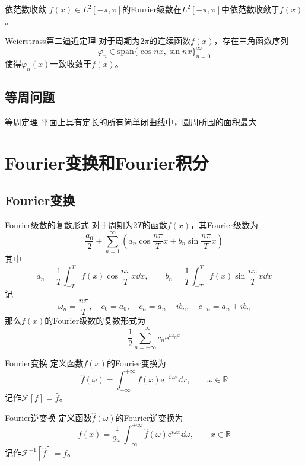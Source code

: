 \documentclass[lang = cn, scheme = chinese, thmcnt = section]{elegantbook}
\newcommand{\R}{\mathbb{R}}            %
\newcommand{\ee}[1]{\mathrm{e}^{#1}}
\begin{document}
\begin{theorem}{依范数收敛}
	$f(x)\in L^2[-\pi,\pi]$的Fourier级数在$L^2[-\pi,\pi]$中依范数收敛于$f(x)$。
\end{theorem}

\begin{theorem}{Weierstrass第二逼近定理}
	对于周期为$2\pi$的连续函数$f(x)$，存在三角函数序列
	$$
	\varphi_n\in 
	\text{span}\{ \cos nx,\sin nx \}_{n=0}^{\infty}
	$$
	使得$\varphi_n(x)$一致收敛于$f(x)$。
\end{theorem}

\subsection{等周问题}

\begin{theorem}{等周定理}
	平面上具有定长的所有简单闭曲线中，圆周所围的面积最大
\end{theorem}

\section{Fourier变换和Fourier积分}

\subsection{Fourier变换}

\begin{theorem}{Fourier级数的复数形式}
	对于周期为$2T$的函数$f(x)$，其Fourier级数为
	$$
	\frac{a_0}{2}+\sum_{n=1}^{\infty}\left(a_n\cos \frac{n\pi}{T}x+b_n\sin \frac{n\pi}{T}x\right)
	$$
	其中
	$$
	a_n=\frac{1}{T}\int_{-T}^{T}f(x)\cos \frac{n\pi}{T} x\dd x,\qquad 
	b_n=\frac{1}{T}\int_{-T}^{T}f(x)\sin \frac{n\pi}{T} x\dd x
	$$
	记
	$$
	\omega_n=\frac{n\pi}{T},\quad 
	c_0=a_0,\quad 
	c_n=a_n-ib_n,\quad 
	c_{-n}=a_n+ib_n
	$$
	那么$f(x)$的Fourier级数的复数形式为
	$$
	\frac{1}{2}\sum_{n=-\infty}^{+\infty}c_n\ee{i\omega_n x}
	$$
\end{theorem}

\begin{definition}{Fourier变换}
	定义函数$f(x)$的Fourier变换为
	$$
	\hat{f}(\omega)=\int_{-\infty}^{+\infty}f(x)\ee{-i\omega x}\dd x,\qquad \omega\in\R
	$$
	记作$\mathscr{F}[f]=\hat{f}$。
\end{definition}

\begin{definition}{Fourier逆变换}
	定义函数$\hat{f}(\omega)$的Fourier逆变换为
	$$
	f(x)=\frac{1}{2\pi}\int_{-\infty}^{+\infty}\hat{f}(\omega)\ee{i\omega x}\dd \omega,\qquad x\in\R
	$$
	记作$\mathscr{F}^{-1}[\hat{f}]=f$。
\end{definition}
\end{document}
